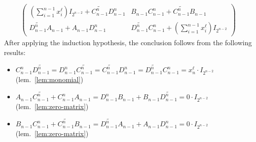 \documentclass [11pt, proquest] {uwthesis}[2020/02/24]
\begin{document}
\begin{prf}
\begin{align*}
\begin{pmatrix}
                (\sum_{i=1}^{n-1} x_i^\ell)I_{2^{n-2}}+\widetilde{C_{n-1}^n}D_{n-1}^n & B_{n-1}C_{n-1}^n+\widetilde{C_{n-1}^n}B_{n-1}\\
                \widetilde{D_{n-1}^n}A_{n-1} + A_{n-1}D_{n-1}^n & \widetilde{D_{n-1}^n}C_{n-1}^n+ (\sum_{i=1}^{n-1} x_i^\ell)I_{2^{n-2}}
            \end{pmatrix}
        \end{align*}
        After applying the induction hypothesis, the conclusion follows from the following results:
        \begin{itemize}
            \item $C_{n-1}^n\widetilde{D_{n-1}^n}=D_{n-1}^n\widetilde{C_{n-1}^n}=\widetilde{C_{n-1}^n}D_{n-1}^n=\widetilde{D_{n-1}^n}C_{n-1}^n=x_n^\ell \cdot I_{2^{n-2}}$ (lem.~\ref{lem:monomial})
            \item $A_{n-1}\widetilde{C_{n-1}^n}+C_{n-1}^nA_{n-1} = D_{n-1}^nB_{n-1}+B_{n-1}\widetilde{D_{n-1}^n}=0\cdot I_{2^{n-2}}$ (lem.~\ref{lem:zero-matrix})
            \item $B_{n-1}C_{n-1}^n+\widetilde{C_{n-1}^n}B_{n-1} = \widetilde{D_{n-1}^n}A_{n-1} + A_{n-1}D_{n-1}^n = 0\cdot I_{2^{n-2}}$ (lem.~\ref{lem:zero-matrix})
        \end{itemize}
    \end{prf}
        
\end{document}
